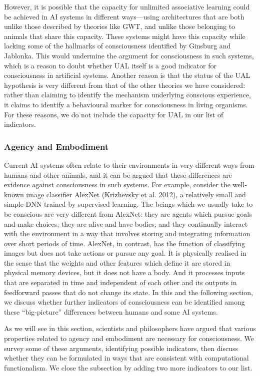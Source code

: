 \documentclass[12pt]{article}
\begin{document}
However, it is possible that the capacity for unlimited associative learning could be achieved in AI systems in different ways—using architectures that are both unlike those described by theories like GWT, and unlike those belonging to animals that share this capacity. These systems might have this capacity while lacking some of the hallmarks of consciousness identified by Ginsburg and Jablonka. This would undermine the argument for consciousness in such systems, which is a reason to doubt whether UAL itself is a good indicator for consciousness in artificial systems. Another reason is that the status of the UAL hypothesis is very different from that of the other theories we have considered: rather than claiming to identify the mechanism underlying conscious experience, it claims to identify a behavioural marker for consciousness in living organisms. For these reasons, we do not include the capacity for UAL in our list of indicators.

\subsubsection{Agency and Embodiment}

Current AI systems often relate to their environments in very different ways from humans and other animals, and it can be argued that these differences are evidence against consciousness in such systems. For example, consider the well-known image classifier AlexNet (Krizhevsky et al. 2012), a relatively small and simple DNN trained by supervised learning. The beings which we usually take to be conscious are very different from AlexNet: they are agents which pursue goals and make choices; they are alive and have bodies; and they continually interact with the environment in a way that involves storing and integrating information over short periods of time. AlexNet, in contrast, has the function of classifying images but does not take actions or pursue any goal. It is physically realised in the sense that the weights and other features which define it are stored in physical memory devices, but it does not have a body. And it processes inputs that are separated in time and independent of each other and its outputs in feedforward passes that do not change its state. In this and the following section, we discuss whether further indicators of consciousness can be identified among these ``big-picture'' differences between humans and some AI systems.

As we will see in this section, scientists and philosophers have argued that various properties related to agency and embodiment are necessary for consciousness. We survey some of these arguments, identifying possible indicators, then discuss whether they can be formulated in ways that are consistent with computational functionalism. We close the subsection by adding two more indicators to our list.
\end{document}
